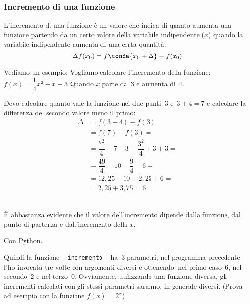 \subsubsection{Incremento di una funzione}
\label{subsubsec:diff01_incremento}

\begin{definizione}
 L'incremento di una funzione è un valore che indica di quanto aumenta una 
funzione partendo da un certo valore della variabile indipendente (\(x\)) 
quando la variabile indipendente aumenta di una certa quantità:
\[\Delta f(x_0) = f \tonda{x_0 + \Delta} - f(x_0)\]
\end{definizione}

\begin{minipage}{.48 \textwidth}
Vediamo un esempio: 
Vogliamo calcolare l'incremento della 
funzione:~\(f(x) = \dfrac{1}{4} x^2 -x -3\)
Quando \(x\) parte da~\(3\) e aumenta di~\(4\).

Devo calcolare quanto vale la funzione nei due punti~$3$ e~$3+4=7$ e 
calcolare la differenza del secondo valore meno il primo:
\begin{align*}
 \Delta &= f(3+4) - f(3) = \\
        &= f(7) - f(3) = \\
        &= \dfrac{7^2}{4}  -7 -3 - \dfrac{3^2}{4}  +3 +3 =\\
        &= \dfrac{49}{4} -10 - \dfrac{9}{4} +6 =\\
        &= 12,25 -10 - 2,25 +6 = \\
        &= 2,25 + 3,75 = 6\\
\end{align*}

\[\]
\end{minipage}
 \hfill
\begin{minipage}{.48 \textwidth}
 \begin{center}
\incremento
 \end{center}
\end{minipage}

È abbastanza evidente che il valore dell'incremento dipende dalla funzione, 
dal punto di partenza e dall'incremento della $x$.

\ifcoding
Con Python.
\fi

Quindi la funzione ~ \texttt{incremento} ~ ha~$3$ 
parametri, nel programma precedente l'ho invocata tre volte con argomenti 
diversi e ottenendo: nel primo caso~$6$, nel secondo~$2$ e nel terzo~$0$. 
Ovviamente, utilizzando una funzione diversa, gli incrementi calcolati con 
gli stessi parametri saranno, in generale diversi. (Prova ad esempio 
con la funzione \(f(x)= 2^x\))


